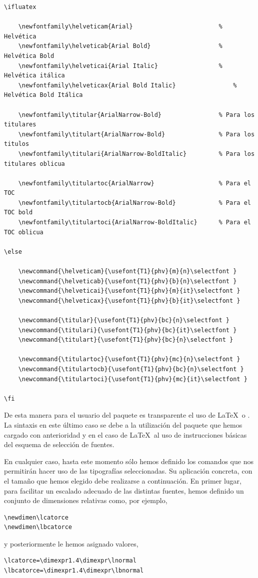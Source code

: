 \begin{lstlisting}[rulecolor=\color{white}]
\ifluatex

	\newfontfamily\helveticam{Arial}						% Helvética
	\newfontfamily\helveticab{Arial Bold}					% Helvética Bold
	\newfontfamily\helveticai{Arial Italic}					% Helvética itálica
	\newfontfamily\helveticax{Arial Bold Italic}				% Helvética Bold Itálica

	\newfontfamily\titular{ArialNarrow-Bold}				% Para los titulares
	\newfontfamily\titulart{ArialNarrow-Bold}				% Para los titulos
	\newfontfamily\titulari{ArialNarrow-BoldItalic}			% Para los titulares oblicua

	\newfontfamily\titulartoc{ArialNarrow}					% Para el TOC
	\newfontfamily\titulartocb{ArialNarrow-Bold}			% Para el TOC bold
	\newfontfamily\titulartoci{ArialNarrow-BoldItalic}		% Para el TOC oblicua

\else

	\newcommand{\helveticam}{\usefont{T1}{phv}{m}{n}\selectfont }
	\newcommand{\helveticab}{\usefont{T1}{phv}{b}{n}\selectfont }
	\newcommand{\helveticai}{\usefont{T1}{phv}{m}{it}\selectfont }
	\newcommand{\helveticax}{\usefont{T1}{phv}{b}{it}\selectfont }

	\newcommand{\titular}{\usefont{T1}{phv}{bc}{n}\selectfont }
	\newcommand{\titulari}{\usefont{T1}{phv}{bc}{it}\selectfont }
	\newcommand{\titulart}{\usefont{T1}{phv}{bc}{n}\selectfont }
	
	\newcommand{\titulartoc}{\usefont{T1}{phv}{mc}{n}\selectfont }
	\newcommand{\titulartocb}{\usefont{T1}{phv}{bc}{n}\selectfont }
	\newcommand{\titulartoci}{\usefont{T1}{phv}{mc}{it}\selectfont }
	
\fi
\end{lstlisting}

De esta manera para el usuario del paquete es transparente el uso de \LaTeX\ o \LuaLaTeX . La sintaxis en este último caso se debe a la utilización del paquete  que hemos cargado con anterioridad y en el caso de \LaTeX\ al uso de instrucciones básicas del esquema de selección de fuentes.

En cualquier caso, hasta este momento sólo hemos definido los comandos que nos permitirán hacer uso de las tipografías seleccionadas. Su aplicación concreta, con el tamaño que hemos elegido debe realizarse a continuación. En primer lugar, para facilitar un escalado adecuado de las distintas fuentes, hemos definido un conjunto de dimensiones relativas como, por ejemplo,
\begin{lstlisting}[frame=none]
\newdimen\lcatorce
\newdimen\lbcatorce
\end{lstlisting}
y posteriormente le hemos asignado valores, 
\begin{lstlisting}[frame=none]
\lcatorce=\dimexpr1.4\dimexpr\lnormal
\lbcatorce=\dimexpr1.4\dimexpr\lbnormal
\end{lstlisting}


